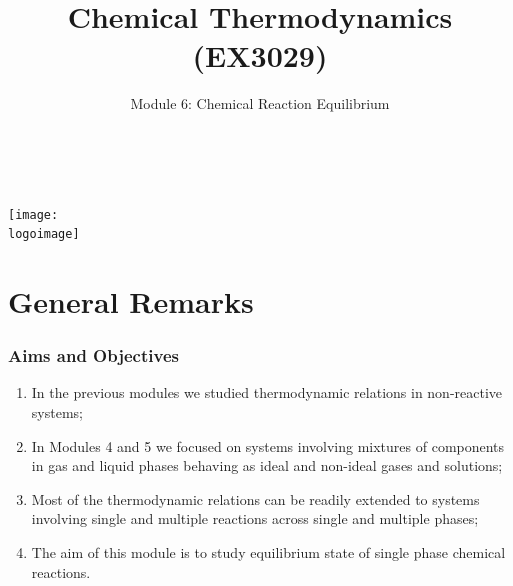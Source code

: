 \documentclass[10pt,compress]{beamer}
\institute{School of Engineering}
\title{Chemical Thermodynamics (EX3029)}
\subtitle{Module 6: Chemical Reaction Equilibrium}
\date[ ]{ }
\author[\shortname]{%
  \fullname\\\ttfamily{\emailaddress}
}
\newcommand{\logoimage}{../../FigBanner/UoAHorizBanner}
\newcounter{reaction}
\begin{document}
\begin{frame}
  \titlepage
  \vfill%
  \begin{center}
    \texttt{[image: \\logoimage]}
  \end{center}
\end{frame}




\section{General Remarks}

\begin{frame}
 \frametitle{Aims and Objectives}
   \begin{enumerate}
     \item<1-> In the previous modules we studied thermodynamic relations in non-reactive systems;
     \item<1-> In Modules 4 and 5 we focused on systems involving mixtures of components in gas and liquid phases behaving as ideal and non-ideal gases and solutions;
     \item<2-> Most of the thermodynamic relations can be readily extended to systems involving single and multiple reactions across single and multiple phases;
     \item<2-> The aim of this module is to study equilibrium state of single phase chemical reactions.
   \end{enumerate}
\end{frame}


\end{document}
